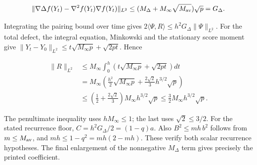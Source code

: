 \documentclass[11pt,a4paper]{report}
\begin{document}
\[\|\nabla\Delta f(Y_t)-\nabla^2f(Y_t)\nabla f(Y_t)\|_{L^2}\le(M_\Delta+M_\infty\sqrt{M_{\rm av}})\sqrt p=G_\Delta.\]

Integrating the pairing bound over time gives \(2\langle\Psi,R\rangle\le h^2G_\Delta\|\Psi\|_{L^2}\). For the total defect, the integral equation, Minkowski and the stationary score moment give \(\|Y_t-Y_0\|_{L^2}\le t\sqrt{M_\infty p}+\sqrt{2pt}\). Hence

\[\begin{aligned}\|R\|_{L^2}&\le M_\infty\int_0^h\left(t\sqrt{M_\infty p}+\sqrt{2pt}\right)dt\\&=M_\infty\left(\frac{h^2}2\sqrt{M_\infty p}+\frac{2\sqrt2}3h^{3/2}\sqrt p\right)\\&\le\left(\frac12+\frac{2\sqrt2}3\right)M_\infty h^{3/2}\sqrt p\le\frac32M_\infty h^{3/2}\sqrt p.\end{aligned}\]

The penultimate inequality uses \(hM_\infty\le1\); the last uses \(\sqrt2\le3/2\). For the stated recurrence floor, \(C=h^2G_\Delta/2=(1-q)a\). Also \(B^2\le mh\,b^2\) follows from \(m\le M_{\rm av}\), and \(mh\le1-q^2=mh(2-mh)\). These verify both scalar recurrence hypotheses. The final enlargement of the nonnegative \(M_\Delta\) term gives precisely the printed coefficient.
\end{document}
